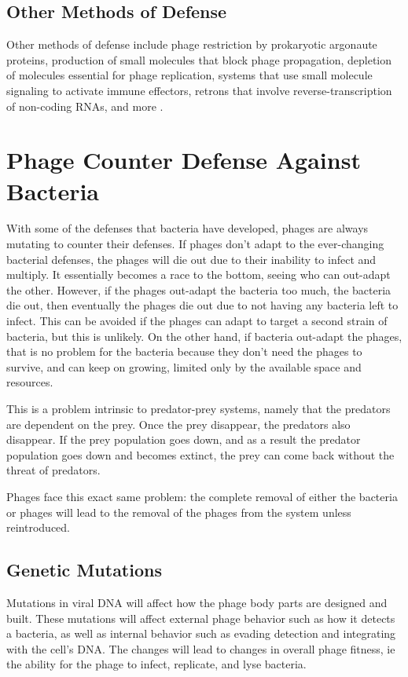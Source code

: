 \subsection{Other Methods of Defense}
Other methods of defense include phage restriction by prokaryotic argonaute proteins, production of small molecules that block phage propagation, depletion of molecules essential for phage replication, systems that use small molecule signaling to activate immune effectors, retrons that involve reverse-transcription of non-coding RNAs, and more \cite{stokar-avihailDiscoveryPhageDeterminants2023}.


\section{Phage Counter Defense Against Bacteria}
With some of the defenses that bacteria have developed, phages are always mutating to counter their defenses. 
If phages don't adapt to the ever-changing bacterial defenses, the phages will die out due to their inability to infect and multiply. 
It essentially becomes a race to the bottom, seeing who can out-adapt the other. 
However, if the phages out-adapt the bacteria too much, the bacteria die out, then eventually the phages die out due to not having any bacteria left to infect. \newline
This can be avoided if the phages can adapt to target a second strain of bacteria, but this is unlikely. 
On the other hand, if bacteria out-adapt the phages, that is no problem for the bacteria because they don't need the phages to survive, and can keep on growing, limited only by the available space and resources. 

This is a problem intrinsic to predator-prey systems, namely that the predators are dependent on the prey. 
Once the prey disappear, the predators also disappear. 
If the prey population goes down, and as a result the predator population goes down and becomes extinct, the prey can come back without the threat of predators. 

Phages face this exact same problem: the complete removal of either the bacteria or phages will lead to the removal of the phages from the system unless reintroduced. 

\subsection{Genetic Mutations}
Mutations in viral DNA will affect how the phage body parts are designed and built. 
These mutations will affect external phage behavior such as how it detects a bacteria, as well as internal behavior such as evading detection and integrating with the cell's DNA. 
The changes will lead to changes in overall phage fitness, ie the ability for the phage to infect, replicate, and lyse bacteria. 

